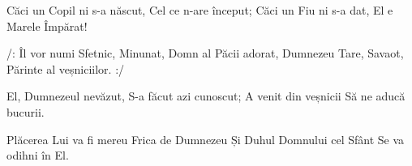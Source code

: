 \beginverse
Căci un Copil ni s-a născut,
Cel ce n-are început;
Căci un Fiu ni s-a dat,
El e Marele Împărat!
\endverse

\beginchorus
/: Îl vor numi Sfetnic, Minunat,
Domn al Păcii adorat,
Dumnezeu Tare, Savaot,
Părinte al veșniciilor. :/
\endchorus

\beginverse
El, Dumnezeul nevăzut,
S-a făcut azi cunoscut;
A venit din veșnicii
Să ne aducă bucurii.
\endverse

\beginverse
Plăcerea Lui va fi mereu
Frica de Dumnezeu
Și Duhul Domnului cel Sfânt
Se va odihni în El.
\endverse
\endsong
